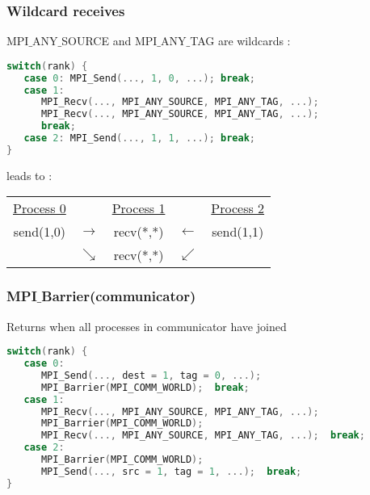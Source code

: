 \begin{frame}[containsverbatim]
\frametitle{Wildcard receives}
MPI$\_$ANY$\_$SOURCE and MPI$\_$ANY$\_$TAG are wildcards :
\begin{lstlisting}[language=C,frame=lines]
switch(rank) {
   case 0: MPI_Send(..., 1, 0, ...); break;
   case 1:
      MPI_Recv(..., MPI_ANY_SOURCE, MPI_ANY_TAG, ...);
      MPI_Recv(..., MPI_ANY_SOURCE, MPI_ANY_TAG, ...);
      break;
   case 2: MPI_Send(..., 1, 1, ...); break;
}
\end{lstlisting}
leads to : \\

\begin{tabular}{ c c c c c}
\underline{Process 0} &   & \underline{Process 1} &  & \underline{Process 2} \\
send(1,0) & $\longrightarrow$  & recv(*,*) & $\longleftarrow$ & send(1,1) \\
          & $\searrow$         & recv(*,*) & $\swarrow$       &           \\
\end{tabular}		
\end{frame}


\begin{frame}[containsverbatim]
\frametitle{MPI$\_$Barrier(communicator)}
Returns when all processes in communicator have joined
\begin{lstlisting}[language=C,frame=lines]
switch(rank) {
   case 0:
      MPI_Send(..., dest = 1, tag = 0, ...);
      MPI_Barrier(MPI_COMM_WORLD);  break;
   case 1:
      MPI_Recv(..., MPI_ANY_SOURCE, MPI_ANY_TAG, ...);
      MPI_Barrier(MPI_COMM_WORLD);
      MPI_Recv(..., MPI_ANY_SOURCE, MPI_ANY_TAG, ...);  break;
   case 2:
      MPI_Barrier(MPI_COMM_WORLD);
      MPI_Send(..., src = 1, tag = 1, ...);  break;
}\end{lstlisting}
\end{frame}

